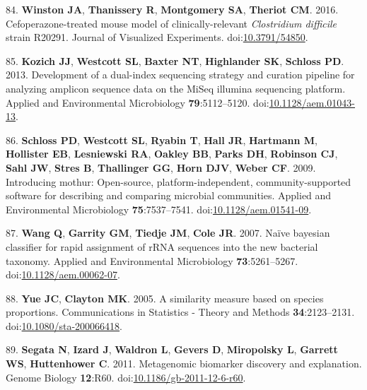 \documentclass[
  12pt,
]{article}
\newenvironment{cslreferences}%
  {}%
  {\par}
\begin{document}
\begin{cslreferences}
\leavevmode\hypertarget{ref-Winston2016}{}%
84. \textbf{Winston JA}, \textbf{Thanissery R}, \textbf{Montgomery SA},
\textbf{Theriot CM}. 2016. Cefoperazone-treated mouse model of
clinically-relevant \emph{Clostridium difficile} strain R20291. Journal
of Visualized Experiments.
doi:\href{https://doi.org/10.3791/54850}{10.3791/54850}.

\leavevmode\hypertarget{ref-Kozich2013}{}%
85. \textbf{Kozich JJ}, \textbf{Westcott SL}, \textbf{Baxter NT},
\textbf{Highlander SK}, \textbf{Schloss PD}. 2013. Development of a
dual-index sequencing strategy and curation pipeline for analyzing
amplicon sequence data on the MiSeq illumina sequencing platform.
Applied and Environmental Microbiology \textbf{79}:5112--5120.
doi:\href{https://doi.org/10.1128/aem.01043-13}{10.1128/aem.01043-13}.

\leavevmode\hypertarget{ref-Schloss2009}{}%
86. \textbf{Schloss PD}, \textbf{Westcott SL}, \textbf{Ryabin T},
\textbf{Hall JR}, \textbf{Hartmann M}, \textbf{Hollister EB},
\textbf{Lesniewski RA}, \textbf{Oakley BB}, \textbf{Parks DH},
\textbf{Robinson CJ}, \textbf{Sahl JW}, \textbf{Stres B},
\textbf{Thallinger GG}, \textbf{Horn DJV}, \textbf{Weber CF}. 2009.
Introducing mothur: Open-source, platform-independent,
community-supported software for describing and comparing microbial
communities. Applied and Environmental Microbiology
\textbf{75}:7537--7541.
doi:\href{https://doi.org/10.1128/aem.01541-09}{10.1128/aem.01541-09}.

\leavevmode\hypertarget{ref-Wang2007}{}%
87. \textbf{Wang Q}, \textbf{Garrity GM}, \textbf{Tiedje JM},
\textbf{Cole JR}. 2007. Naïve bayesian classifier for rapid assignment
of rRNA sequences into the new bacterial taxonomy. Applied and
Environmental Microbiology \textbf{73}:5261--5267.
doi:\href{https://doi.org/10.1128/aem.00062-07}{10.1128/aem.00062-07}.

\leavevmode\hypertarget{ref-Yue2005}{}%
88. \textbf{Yue JC}, \textbf{Clayton MK}. 2005. A similarity measure
based on species proportions. Communications in Statistics - Theory and
Methods \textbf{34}:2123--2131.
doi:\href{https://doi.org/10.1080/sta-200066418}{10.1080/sta-200066418}.

\leavevmode\hypertarget{ref-Segata2011}{}%
89. \textbf{Segata N}, \textbf{Izard J}, \textbf{Waldron L},
\textbf{Gevers D}, \textbf{Miropolsky L}, \textbf{Garrett WS},
\textbf{Huttenhower C}. 2011. Metagenomic biomarker discovery and
explanation. Genome Biology \textbf{12}:R60.
doi:\href{https://doi.org/10.1186/gb-2011-12-6-r60}{10.1186/gb-2011-12-6-r60}.


\end{cslreferences}
\end{document}
